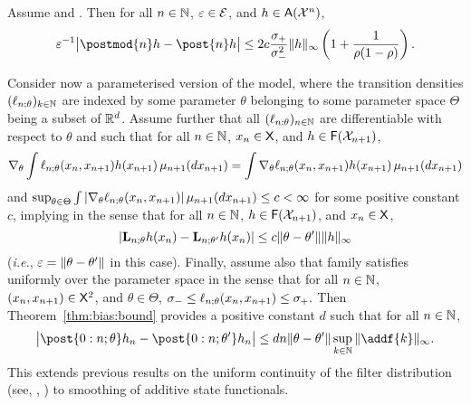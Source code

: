\begin{corollary} \label{cor:filter:sensitivity}
 Assume  and . Then for all $n \in \mathbb{N}$, $\varepsilon \in \mathcal{E}$, and $h \in \mathsf{A}(\mathcal{X}^n)$,
        $$
        \precpar^{-1} \big| \postmod{n} h -  \post{n} h \big| \leq 2 c \frac{\udup}{\udlow^2}  \| h \|_\infty \left( 1 + \frac{1}{\rho (1 - \rho)} \right).   
    $$
\end{corollary}

\begin{remark}
Consider now a parameterised version of the model, where the transition densities $(\ell_{n ; \theta})_{k \in \mathbb{N}}$ are indexed by some parameter $\theta$ belonging to some parameter space $\Theta$ being a subset of $\mathbb{R}^d$. Assume further that all $(\ell_{n ; \theta})_{n \in \mathbb{N}}$ are differentiable with respect to $\theta$ and such that for all $n \in \mathbb{N}$, $x_n \in \mathsf{X}$, and $h \in \mathsf{F}(\mathcal{X}_{n + 1})$,  
$$
\nabla_\theta \int \ell_{n ; \theta}(x_n, x_{n + 1}) h(x_{n + 1}) \, \mu_{n + 1}(d x_{n + 1}) = \int \nabla_\theta \ell_{n ; \theta}(x_n, x_{n + 1}) h(x_{n + 1}) \, \mu_{n + 1}(d x_{n + 1})
$$
and $\sup_{\theta \in \Theta} \int |\nabla_\theta \ell_{n ; \theta}(x_n, x_{n + 1})| \, \mu_{n + 1}(d x_{n + 1}) \leq c < \infty$ for some positive constant $c$, implying  in the sense that for all $n \in \mathbb{N}$, $h \in \mathsf{F}(\mathcal{X}_{n + 1})$, and $x_n \in \mathsf{X}$, 
$$
| \mathbf{L}_{n; \theta}h(x_n) - \mathbf{L}_{n; \theta'}h(x_n) | \leq c \| \theta - \theta' \| \| h \|_\infty
$$
(\emph{i.e.}, $\varepsilon = \| \theta - \theta' \|$ in this case). Finally, assume also that family satisfies  uniformly over the parameter space in the sense that for all $n \in \mathbb{N}$, $(x_n, x_{n + 1}) \in \mathsf{X}^2$, and $\theta \in \Theta$, 
$
\sigma_- \leq \ell_{n; \theta}(x_n, x_{n + 1}) \leq \sigma_+. 
$  
Then Theorem~\ref{thm:bias:bound} provides a positive constant $d$ such that for all $n \in \mathbb{N}$,  
$$
\big| \post{0:n ; \theta} h_n -  \post{0:n ; \theta'} h_n \big|  
\leq d n \| \theta - \theta' \| \sup_{k \in \nset} \| \addf{k} \|_\infty. 
$$
This extends previous results on the uniform continuity of the filter distribution (see, \eg, \cite{papavasiliou:2006,legland:oudjane:2004}) to smoothing of additive state functionals.  
\end{remark}
